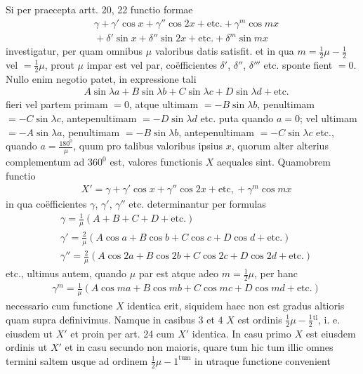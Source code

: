 Si per praecepta artt. 20, 22 functio formae
\[
\begin{aligned}
&\gamma+\gamma'\cos x+\gamma''\cos2x+\mathrm{etc.}+\gamma^m\cos mx\\[5pt]
&{}+\delta'\sin x+\delta''\sin2x+\mathrm{etc.}+\delta^m\sin mx
\end{aligned}
\]
investigatur, per quam omnibus $\mu$ valoribus datis satisfit. et in qua $m=\frac12\mu-\frac12$ vel $=\frac12\mu$, prout $\mu$ impar est vel par, coëfficientes $\delta'$, $\delta''$, $\delta'''$ etc. sponte fient $=0$. Nullo enim negotio patet, in expressione tali
\[
\begin{aligned}
&A\sin\lambda a+B\sin\lambda b+C\sin\lambda c+D\sin\lambda d+\mathrm{etc.}
\end{aligned}
\]
fieri vel partem primam $=0$, atque ultimam $=-B\sin\lambda b$, penultimam $=-C\sin\lambda c$, antepenultimam $=-D\sin\lambda d$ etc. puta quando $a=0$; vel ultimam $=-A\sin\lambda a$, penultimam $=-B\sin\lambda b$, antepenultimam $=-C\sin\lambda c$ etc., quando $a=\frac{180^{\mathord{0}}}{\mu}$, quum pro talibus valoribus ipsius $x$, quorum alter alterius complementum ad $360^{\mathord{0}}$ est, valores functionis $X$ aequales sint. Quamobrem functio
\[
\begin{aligned}
&X'=\gamma+\gamma'\cos x+\gamma''\cos2x+\mathrm{etc,}+\gamma^m\cos mx
\end{aligned}
\]
in qua coëfficientes $\gamma$, $\gamma'$, $\gamma''$ etc. determinantur per formulas
\[
\begin{aligned}
&\gamma = \frac{1}{\mu}(A+B+C+D+\mathrm{etc.})\\[5pt]
&\gamma' = \frac{2}{\mu}(A\cos a+B\cos b+C\cos c+D\cos d+\mathrm{etc.})\\[5pt]
&\gamma'' = \frac{2}{\mu}(A\cos 2a+B\cos 2b+C\cos 2c+D\cos 2d+\mathrm{etc.})
\end{aligned}
\]
etc., ultimus autem, quando $\mu$ par est atque adeo $m=\frac12\mu$, per hanc
\[
\begin{aligned}
&\gamma^m=\frac{1}{\mu}(A\cos ma+B\cos mb+C\cos mc+D\cos md+\mathrm{etc.})
\end{aligned}
\]
necessario cum functione $X$ identica erit, siquidem haec non est gradus altioris
quam supra definivimus. Namque in casibus $3$ et $4$ $X$ est ordinis
$\frac12\mu-\frac12{}^{\mathrm{ti}}$, i. e.
eiusdem ut $X'$ et proin per art. 24 cum $X'$ identica. In casu primo $X$ est eiusdem ordinis ut $X'$ et in casu secundo non maioris, quare tum hic tum illic omnes
termini saltem usque ad ordinem $\frac12\mu-1^{\mathrm{tum}}$ in utraque functione convenient
